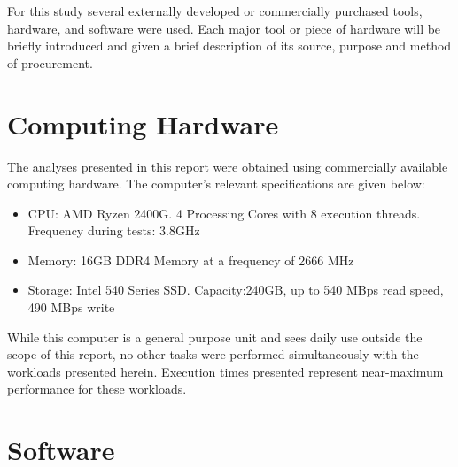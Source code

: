 For this study several externally developed or commercially purchased tools, hardware, and software were used. Each major tool or piece of hardware will be briefly introduced and given a brief description of its source, purpose and method of procurement.

\section{Computing Hardware}
The analyses presented in this report were obtained using commercially available computing hardware. The computer's relevant specifications are given below: 

\begin{itemize}
\item CPU: AMD Ryzen 2400G. 4 Processing Cores with 8 execution threads. Frequency during tests: 3.8GHz
\item Memory: 16GB DDR4 Memory at a frequency of 2666 MHz
\item Storage: Intel 540 Series SSD. Capacity:240GB, up to 540 MBps read speed, 490 MBps write
\end{itemize}

While this computer is a general purpose unit and sees daily use outside the scope of this report, no other tasks were performed simultaneously with the workloads presented herein. Execution times presented represent near-maximum performance for these workloads. 

\section{Software}
